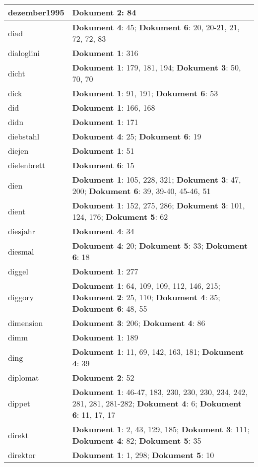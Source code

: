 \documentclass[a5paper]{article}
\begin{document}
\begin{longtable}[l]{|l|p{3in}|}
\hline
dezember1995 & \textbf{Dokument 2}: 84 \\
\hline
diad & \textbf{Dokument 4}: 45; \textbf{Dokument 6}: 20, 20-21, 21, 72, 72, 83 \\
\hline
dialoglini & \textbf{Dokument 1}: 316 \\
\hline
dicht & \textbf{Dokument 1}: 179, 181, 194; \textbf{Dokument 3}: 50, 70, 70 \\
\hline
dick & \textbf{Dokument 1}: 91, 191; \textbf{Dokument 6}: 53 \\
\hline
did & \textbf{Dokument 1}: 166, 168 \\
\hline
didn & \textbf{Dokument 1}: 171 \\
\hline
diebstahl & \textbf{Dokument 4}: 25; \textbf{Dokument 6}: 19 \\
\hline
diejen & \textbf{Dokument 1}: 51 \\
\hline
dielenbrett & \textbf{Dokument 6}: 15 \\
\hline
dien & \textbf{Dokument 1}: 105, 228, 321; \textbf{Dokument 3}: 47, 200; \textbf{Dokument 6}: 39, 39-40, 45-46, 51 \\
\hline
dient & \textbf{Dokument 1}: 152, 275, 286; \textbf{Dokument 3}: 101, 124, 176; \textbf{Dokument 5}: 62 \\
\hline
diesjahr & \textbf{Dokument 4}: 34 \\
\hline
diesmal & \textbf{Dokument 4}: 20; \textbf{Dokument 5}: 33; \textbf{Dokument 6}: 18 \\
\hline
diggel & \textbf{Dokument 1}: 277 \\
\hline
diggory & \textbf{Dokument 1}: 64, 109, 109, 112, 146, 215; \textbf{Dokument 2}: 25, 110; \textbf{Dokument 4}: 35; \textbf{Dokument 6}: 48, 55 \\
\hline
dimension & \textbf{Dokument 3}: 206; \textbf{Dokument 4}: 86 \\
\hline
dimm & \textbf{Dokument 1}: 189 \\
\hline
ding & \textbf{Dokument 1}: 11, 69, 142, 163, 181; \textbf{Dokument 4}: 39 \\
\hline
diplomat & \textbf{Dokument 2}: 52 \\
\hline
dippet & \textbf{Dokument 1}: 46-47, 183, 230, 230, 230, 234, 242, 281, 281, 281-282; \textbf{Dokument 4}: 6; \textbf{Dokument 6}: 11, 17, 17 \\
\hline
direkt & \textbf{Dokument 1}: 2, 43, 129, 185; \textbf{Dokument 3}: 111; \textbf{Dokument 4}: 82; \textbf{Dokument 5}: 35 \\
\hline
direktor & \textbf{Dokument 1}: 1, 298; \textbf{Dokument 5}: 10 \\

\end{longtable}
\end{document}
